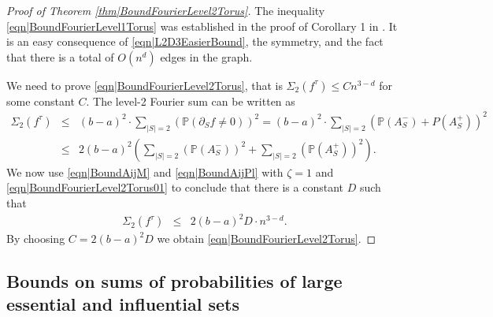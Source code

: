 \documentclass[reqno]{amsart}
\begin{document}
\begin{proof}[Proof of Theorem \ref{thm|BoundFourierLevel2Torus}]
The inequality \eqref{eqn|BoundFourierLevel1Torus} was established in the proof of Corollary 1 %
 in \cite{FirstPaper2025}. It is an easy consequence of \eqref{eqn|L2D3EasierBound}, the symmetry, and the fact that there is a total of $O( n^d)$ edges in the graph. 

We need to prove \eqref{eqn|BoundFourierLevel2Torus}, that is $\Sigma_2(f^{\tau})\leq Cn^{3-d}$ for some constant $C$. The level-2 Fourier sum can be written as 
\begin{eqnarray}
\Sigma_2(f^{\tau})&\leq& (b-a)^2\cdot \sum_{|S|=2} \left(\mathbb P(\partial_Sf\neq 0)\right)^2 = (b-a)^2
\cdot 
\sum_{|S|=2} \left(\mathbb P(A_S^-)+P(A_S^+)\right)^2\nonumber \\
&\leq& 2(b-a)^2\left(\sum_{|S|=2}\left(\mathbb P(A_S^-)\right)^2 +\sum_{|S|=2}\left(\mathbb P(A_S^+)\right)^2 \right).
\label{eqn|BoundFourierLevel2Torus01}
\end{eqnarray}
We now use \eqref{eqn|BoundAijM} and \eqref{eqn|BoundAijPl} with $\zeta=1$ and \eqref{eqn|BoundFourierLevel2Torus01} to conclude that there is a constant $D$ such that
\begin{eqnarray}
\Sigma_2(f^{\tau})&\leq& 2(b-a)^2D\cdot n^{3-d}.
\end{eqnarray}
By choosing $C=2(b-a)^2D$ we obtain \eqref{eqn|BoundFourierLevel2Torus}.
\end{proof}

 





\subsection{Bounds on sums of probabilities of large essential and influential sets}\label{subs|GeneralM}
\end{document}
